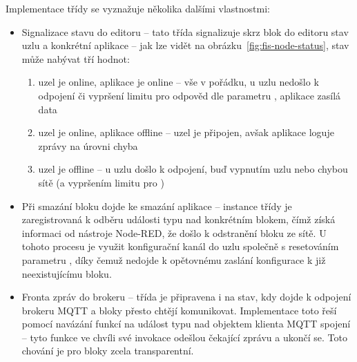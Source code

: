 Implementace třídy  se vyznažuje několika dalšími vlastnostmi:
\begin{itemize}
    \item Signalizace stavu do editoru -- tato třída signalizuje skrz blok do editoru stav uzlu a konkrétní
    aplikace -- jak lze vidět na obrázku~\ref{fig:fis-node-status}, stav může nabývat tří hodnot:
    \begin{enumerate}
        \item uzel je online, aplikace je online -- vše v pořádku, u uzlu nedošlo k odpojení či vypršení limitu pro
        odpověd dle parametru , aplikace zasílá data
        \item uzel je online, aplikace offline -- uzel je připojen, avšak aplikace loguje zprávy na úrovni chyba
        \item uzel je offline -- u uzlu došlo k odpojení, buď vypnutím uzlu nebo chybou sítě (a vypršením limitu pro
        )
    \end{enumerate}
    \item Při smazání bloku dojde ke smazání aplikace -- instance třídy  je zaregistrovaná k odběru
    události typu  nad konkrétním blokem, čímž získá informaci od nástroje Node-RED, že došlo k
    odstranění bloku ze sítě.
    U tohoto procesu je využit konfigurační kanál do uzlu společně s resetováním parametru , díky čemuž
    nedojde k opětovnému zaslání konfigurace k již neexistujícímu bloku.
    \item Fronta zpráv do brokeru -- třída je připravena i na stav, kdy dojde k odpojení brokeru MQTT a bloky
    přesto chtějí komunikovat.
    Implementace toto řeší pomocí navázání funkcí na událost typu  nad
    objektem klienta MQTT spojení -- tyto funkce ve chvíli své invokace odešlou čekající zprávu a ukončí se.
    Toto chování je pro bloky zcela transparentní.
\end{itemize}

